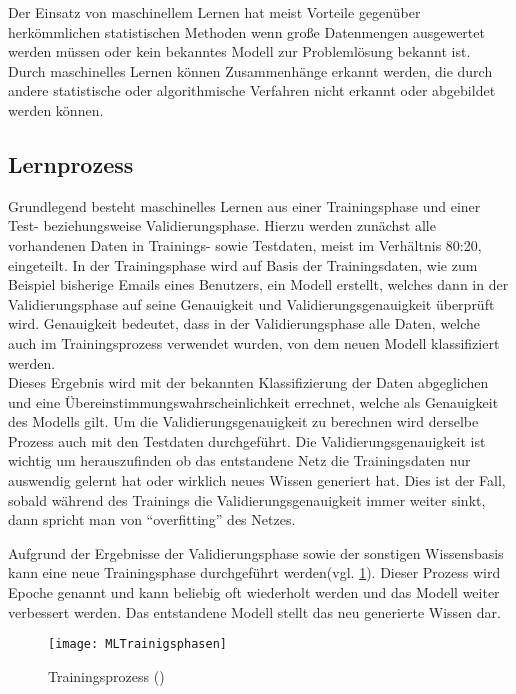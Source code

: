     Der Einsatz von maschinellem Lernen hat meist Vorteile gegenüber herkömmlichen statistischen Methoden wenn große Datenmengen ausgewertet werden müssen oder kein bekanntes Modell zur Problemlösung bekannt ist.
    Durch maschinelles Lernen können Zusammenhänge erkannt werden, die durch andere statistische oder algorithmische Verfahren nicht erkannt oder abgebildet werden können.

    \subsection{Lernprozess} \label{Lernprozess}
    Grundlegend besteht maschinelles Lernen aus einer Trainingsphase und einer Test- beziehungsweise Validierungsphase.
    Hierzu werden zunächst alle vorhandenen Daten in Trainings- sowie Testdaten, meist im Verhältnis 80:20, eingeteilt.
    In der Trainingsphase wird auf Basis der Trainingsdaten, wie zum Beispiel bisherige Emails eines Benutzers, ein Modell erstellt, welches dann in der Validierungsphase auf seine Genauigkeit und Validierungsgenauigkeit überprüft wird.
    Genauigkeit bedeutet, dass in der Validierungsphase alle Daten, welche auch im Trainingsprozess verwendet wurden, von dem neuen Modell klassifiziert werden.\\


    Dieses Ergebnis wird mit der bekannten Klassifizierung der Daten abgeglichen und eine Übereinstimmungswahrscheinlichkeit errechnet, welche als Genauigkeit des Modells gilt.
    Um die Validierungsgenauigkeit zu berechnen wird derselbe Prozess auch mit den Testdaten durchgeführt.
    Die Validierungsgenauigkeit ist wichtig um herauszufinden ob das entstandene Netz die Trainingsdaten nur auswendig gelernt hat oder wirklich neues Wissen generiert hat.
    Dies ist der Fall, sobald während des Trainings die Validierungsgenauigkeit immer weiter sinkt, dann spricht man von "`overfitting"' des Netzes.
    \newline

    \noindent
    Aufgrund der Ergebnisse der Validierungsphase sowie der sonstigen Wissensbasis kann eine neue Trainingsphase durchgeführt werden(vgl. \ref{fig:MLTrainigsprozess}).
    Dieser Prozess wird Epoche genannt und kann beliebig oft wiederholt werden und das Modell weiter verbessert werden.
    Das entstandene Modell stellt das neu generierte Wissen dar.

    \begin{figure}[H]
        \centering
        \texttt{[image: MLTrainigsphasen]}
        \caption{Trainingsprozess (\cite[Figure 1-2]{HandsOnML})}
        \label{fig:MLTrainigsprozess}
    \end{figure}


